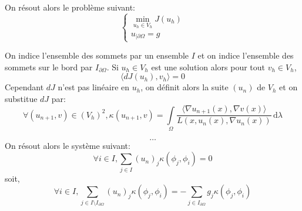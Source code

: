 \documentclass[a4paper, 11pt]{article}
\begin{document}
On r\'esout alors le probl\`eme suivant:
\begin{equation}
\begin{cases}
\min\limits_{u_h\in V_h} J(u_h) \\
u_{|\partial\Omega}=g
\end{cases}
\end{equation}

On indice l'ensemble des sommets par un ensemble $I$ et on indice l'ensemble des
 sommets sur le bord par $I_{\partial\Omega}$.
Si $u_h\in V_h$ est une solution alors pour tout $v_h\in V_h$,
$$
\langle dJ(u_h), v_h\rangle = 0
$$
Cependant $dJ$ n'est pas lin\'eaire en $u_h$, on d\'efinit alors la suite
 $(u_n)$ de $V_h$ et on substitue $dJ$ par:
$$
\forall (u_{n+1}, v)\in (V_h)^2, \kappa(u_{n+1}, v)=\int\limits_\Omega
\frac{\langle\nabla u_{n+1}(x), \nabla v(x)\rangle}{L(x, u_n(x), \nabla u_n(x))}
\,\mathrm{d}\lambda
$$

$$
\dots
$$
On r\'esout alors le syst\`eme suivant:
$$
\forall i\in I, \sum_{j\in I}(u_n)_j\kappa(\phi_j, \phi_i)=0
$$
soit,
$$
\forall i\in I, \sum\limits_{j\in I\setminus I_{\partial\Omega}}
(u_n)_j\kappa(\phi_j, \phi_i)=-\sum\limits_{j\in I_{\partial\Omega}}
g_j\kappa(\phi_j, \phi_i)
$$
\end{document}
